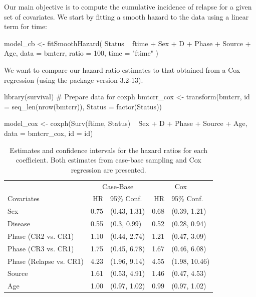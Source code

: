 Our main objective is to compute the cumulative incidence of relapse for
a given set of covariates. We start by fitting a smooth hazard to the
data using a linear term for time:

\begin{Schunk}
\begin{Sinput}
model_cb <- fitSmoothHazard(
  Status ~ ftime + Sex + D + Phase + Source + Age,
  data = bmtcrr,
  ratio = 100,
  time = "ftime"
)
\end{Sinput}
\end{Schunk}

We want to compare our hazard ratio estimates to that obtained from a
Cox regression (using the  package version 3.2-13).

\begin{Schunk}
\begin{Sinput}
library(survival)
# Prepare data for coxph
bmtcrr_cox <- transform(bmtcrr, 
                        id = seq_len(nrow(bmtcrr)),
                        Status = factor(Status))

model_cox <- coxph(Surv(ftime, Status) ~ Sex + D + Phase + Source + Age,
                   data = bmtcrr_cox, id = id)
\end{Sinput}
\end{Schunk}

\begin{Schunk}
\begin{table}

\caption{\label{tab:bmtcrr-cis}Estimates and confidence intervals for the hazard ratios for each coefficient. Both estimates from case-base sampling and Cox regression are presented.}
\centering
\begin{tabular}[t]{lrlrl}
\toprule
\multicolumn{1}{c}{ } & \multicolumn{2}{c}{Case-Base} & \multicolumn{2}{c}{Cox} \\
\cmidrule(l{3pt}r{3pt}){2-3} \cmidrule(l{3pt}r{3pt}){4-5}
Covariates & HR & 95\% Conf. & HR & 95\% Conf.\\
\midrule
Sex & 0.75 & (0.43, 1.31) & 0.68 & (0.39, 1.21)\\
Disease & 0.55 & (0.3, 0.99) & 0.52 & (0.28, 0.94)\\
Phase (CR2 vs. CR1) & 1.10 & (0.44, 2.74) & 1.21 & (0.47, 3.09)\\
Phase (CR3 vs. CR1) & 1.75 & (0.45, 6.78) & 1.67 & (0.46, 6.08)\\
Phase (Relapse vs. CR1) & 4.23 & (1.96, 9.14) & 4.55 & (1.98, 10.46)\\
\addlinespace
Source & 1.61 & (0.53, 4.91) & 1.46 & (0.47, 4.53)\\
Age & 1.00 & (0.97, 1.02) & 0.99 & (0.97, 1.02)\\
\bottomrule
\end{tabular}
\end{table}

\end{Schunk}


